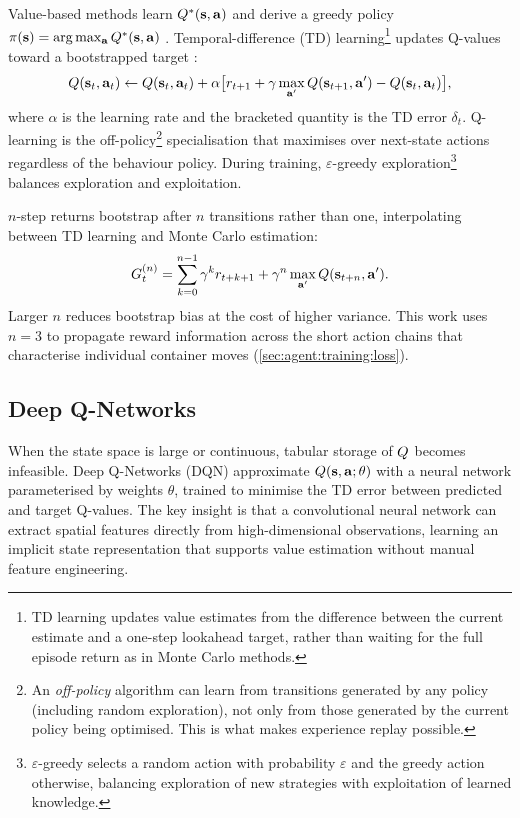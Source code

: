 Value-based methods learn $Q^*(\mathbf{s}, \mathbf{a})$ and derive a greedy policy $\pi(\mathbf{s}) = \arg\max_{\mathbf{a}} Q^*(\mathbf{s}, \mathbf{a})$ \cite{suttonbarto2018}. Temporal-difference (TD) learning\footnote{TD learning updates value estimates from the difference between the current estimate and a one-step lookahead target, rather than waiting for the full episode return as in Monte Carlo methods.} updates Q-values toward a bootstrapped target \cite{sutton1988td}:
\begin{equation}
\label{eq:td}
Q(\mathbf{s}_t, \mathbf{a}_t) \leftarrow Q(\mathbf{s}_t, \mathbf{a}_t) + \alpha \bigl[r_{t+1} + \gamma \max_{\mathbf{a}'} Q(\mathbf{s}_{t+1}, \mathbf{a}') - Q(\mathbf{s}_t, \mathbf{a}_t)\bigr],
\end{equation}
where $\alpha$ is the learning rate and the bracketed quantity is the TD error $\delta_t$. Q-learning \cite{watkinsdayan1992} is the off-policy\footnote{An \emph{off-policy} algorithm can learn from transitions generated by any policy (including random exploration), not only from those generated by the current policy being optimised. This is what makes experience replay possible.} specialisation that maximises over next-state actions regardless of the behaviour policy. During training, $\varepsilon$-greedy exploration\footnote{$\varepsilon$-greedy selects a random action with probability $\varepsilon$ and the greedy action otherwise, balancing exploration of new strategies with exploitation of learned knowledge.} balances exploration and exploitation.

$n$-step returns \cite{sutton1988td} bootstrap after $n$ transitions rather than one, interpolating between TD learning and Monte Carlo estimation:
\begin{equation}
\label{eq:nstep}
G_t^{(n)} = \sum_{k=0}^{n-1} \gamma^k r_{t+k+1} + \gamma^n \max_{\mathbf{a}'} Q(\mathbf{s}_{t+n}, \mathbf{a}').
\end{equation}
Larger $n$ reduces bootstrap bias at the cost of higher variance. This work uses $n = 3$ to propagate reward information across the short action chains that characterise individual container moves (\cref{sec:agent:training:loss}).

\subsection{Deep Q-Networks}
\label{sec:bg:rl:dqn}

When the state space is large or continuous, tabular storage of $Q$ becomes infeasible. Deep Q-Networks (DQN) \cite{mnih2015dqn} approximate $Q(\mathbf{s}, \mathbf{a}; \theta)$ with a neural network parameterised by weights $\theta$, trained to minimise the TD error between predicted and target Q-values. The key insight is that a convolutional neural network can extract spatial features directly from high-dimensional observations, learning an implicit state representation that supports value estimation without manual feature engineering.

